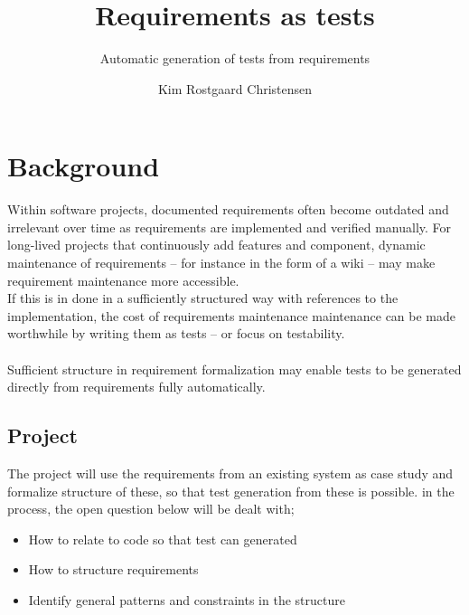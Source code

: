\documentclass[10pt]{scrartcl}
\author{Kim Rostgaard Christensen}
\title{Requirements as tests}
\subtitle{Automatic generation of tests from requirements}
\begin{document}
\maketitle

\section*{Background}
Within software projects, documented requirements often become outdated and irrelevant over time as requirements are implemented and verified manually. For long-lived projects that continuously add features and component, dynamic maintenance of requirements -- for instance in the form of a wiki -- may make requirement maintenance more accessible.\\
If this is in done in a sufficiently structured way with references to the implementation, the cost of requirements maintenance maintenance can be made worthwhile by writing them as tests -- or focus on testability.\\\\
Sufficient structure in requirement formalization may enable tests to be generated directly from requirements fully automatically.

\subsection*{Project}
The project will use the requirements from an existing system as case study and formalize structure of these, so that test generation from these is possible.
in the process, the open question below will be dealt with;
\begin{itemize}
  \item How to relate to code so that test can generated
  \item How to structure requirements
  \item Identify general patterns and constraints in the structure
\end{itemize}
\end{document}
